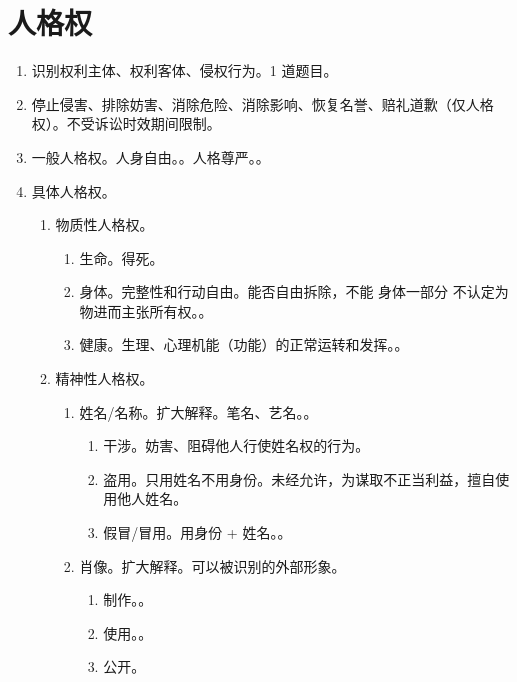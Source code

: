 \section{人格权}
\begin{enumerate}
  \item 识别权利主体、权利客体、侵权行为。1 道题目。
  \item 停止侵害、排除妨害、消除危险、消除影响、恢复名誉、赔礼道歉（仅人格权）。不受诉讼时效期间限制。
  \item 一般人格权。\yi 人身自由。。\er 人格尊严。。
  \item 具体人格权。
        \begin{enumerate}
          \item 物质性人格权。
                \begin{enumerate}
                  \item 生命。得死。
                  \item 身体。完整性和行动自由。能否自由拆除，不能 \yjt 身体一部分 \yjt 不认定为物进而主张所有权。。
                  \item 健康。生理、心理机能（功能）的正常运转和发挥。。
                \end{enumerate}
          \item 精神性人格权。
                \begin{enumerate}
                  \item 姓名/名称。扩大解释。笔名、艺名。。
                        \begin{enumerate}
                          \item 干涉。妨害、阻碍他人行使姓名权的行为。
                          \item 盗用。只用姓名不用身份。未经允许，为谋取不正当利益，擅自使用他人姓名。
                          \item 假冒/冒用。用身份 + 姓名。。
                        \end{enumerate}
                  \item 肖像。扩大解释。可以被识别的外部形象。
                        \begin{enumerate}
                          \item 制作。。
                          \item 使用。。
                          \item 公开。

\end{enumerate}
\end{enumerate}
\end{enumerate}
\end{enumerate}

